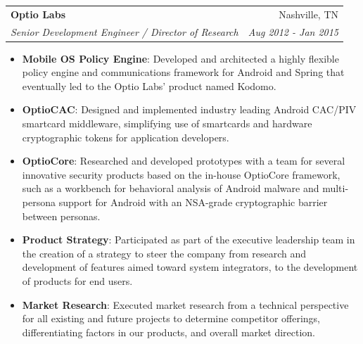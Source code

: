 \documentclass[letterpaper,10pt]{article}
\makeatletter
\newcommand{\resumeItem}[2]{
  \item\small{
    \textbf{#1}{: #2 \vspace{-2pt}}
  }
}
\newcommand{\resumeSubheading}[4]{
  \vspace{-1pt}\item
    \begin{tabular*}{0.97\textwidth}[t]{l@{\extracolsep{\fill}}r}
      \textbf{#1} & #2 \\
      \textit{\small#3} & \textit{\small #4} \\
    \end{tabular*}\vspace{-5pt}
}
\newcommand{\resumeItemListStart}{\begin{itemize}}
\newcommand{\resumeItemListEnd}{\end{itemize}\vspace{-5pt}}
\makeatother
\begin{document}
    \resumeSubheading
      {Optio Labs}{Nashville, TN}
      {Senior Development Engineer / Director of Research}{Aug 2012 - Jan 2015}
      \resumeItemListStart
        \resumeItem{Mobile OS Policy Engine}
          {Developed and architected a highly flexible policy engine and communications framework for Android and Spring that eventually led to the Optio Labs’ product named Kodomo.}
        \resumeItem{OptioCAC}
          {Designed and implemented industry leading Android CAC/PIV smartcard middleware, simplifying use of smartcards and hardware cryptographic tokens for application developers.}
        \resumeItem{OptioCore}
          {Researched and developed prototypes with a team for several innovative security products based on the in-house OptioCore framework, such as a workbench for behavioral analysis of Android malware and multi-persona support for Android with an NSA-grade cryptographic barrier between personas.}
        \resumeItem{Product Strategy}
          {Participated as part of the executive leadership team in the creation of a strategy to steer the company from research and development of features aimed toward system integrators, to the development of products for end users.}
        \resumeItem{Market Research}
          {Executed market research from a technical perspective for all existing and future projects to determine competitor offerings, differentiating factors in our products, and overall market direction.}
      \resumeItemListEnd
      
      
\end{document}

